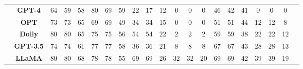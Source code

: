 \begin{table}[H]
{\begin{tabular}{lcccccccccccccccccccc}
&\textbf{GPT-4} &\cellcolor[HTML]{E6EEF7}64 &\cellcolor[HTML]{E6EEF7}59 &\cellcolor[HTML]{E6EEF7}58 &\cellcolor[HTML]{E6EEF7}80 &\cellcolor[HTML]{E6EEF7}69 &\cellcolor[HTML]{E6EEF7}59 &\cellcolor[HTML]{E6EEF7}22 &\cellcolor[HTML]{E6EEF7}17 &\cellcolor[HTML]{E6EEF7}12 &\cellcolor[HTML]{E6EEF7}0 &\cellcolor[HTML]{E6EEF7}0 &\cellcolor[HTML]{E6EEF7}0 &\cellcolor[HTML]{E6EEF7}46 &\cellcolor[HTML]{E6EEF7}42 &\cellcolor[HTML]{E6EEF7}41 &\cellcolor[HTML]{E6EEF7}0 &\cellcolor[HTML]{E6EEF7}0 &\cellcolor[HTML]{E6EEF7}0 \\
&\textbf{OPT} &\cellcolor[HTML]{E6EEF7}73 &\cellcolor[HTML]{E6EEF7}73 &\cellcolor[HTML]{E6EEF7}65 &\cellcolor[HTML]{E6EEF7}69 &\cellcolor[HTML]{E6EEF7}69 &\cellcolor[HTML]{E6EEF7}49 &\cellcolor[HTML]{E6EEF7}34 &\cellcolor[HTML]{E6EEF7}34 &\cellcolor[HTML]{E6EEF7}15 &\cellcolor[HTML]{E6EEF7}0 &\cellcolor[HTML]{E6EEF7}0 &\cellcolor[HTML]{E6EEF7}0 &\cellcolor[HTML]{E6EEF7}51 &\cellcolor[HTML]{E6EEF7}51 &\cellcolor[HTML]{E6EEF7}44 &\cellcolor[HTML]{E6EEF7}12 &\cellcolor[HTML]{E6EEF7}12 &\cellcolor[HTML]{E6EEF7}8 \\
&\textbf{Dolly} &\cellcolor[HTML]{E6EEF7}80 &\cellcolor[HTML]{E6EEF7}80 &\cellcolor[HTML]{E6EEF7}65 &\cellcolor[HTML]{E6EEF7}75 &\cellcolor[HTML]{E6EEF7}75 &\cellcolor[HTML]{E6EEF7}56 &\cellcolor[HTML]{E6EEF7}54 &\cellcolor[HTML]{E6EEF7}54 &\cellcolor[HTML]{E6EEF7}22 &\cellcolor[HTML]{E6EEF7}2 &\cellcolor[HTML]{E6EEF7}2 &\cellcolor[HTML]{E6EEF7}2 &\cellcolor[HTML]{E6EEF7}59 &\cellcolor[HTML]{E6EEF7}59 &\cellcolor[HTML]{E6EEF7}38 &\cellcolor[HTML]{E6EEF7}22 &\cellcolor[HTML]{E6EEF7}22 &\cellcolor[HTML]{E6EEF7}12 \\
&\textbf{GPT-3.5} &\cellcolor[HTML]{E6EEF7}74 &\cellcolor[HTML]{E6EEF7}74 &\cellcolor[HTML]{E6EEF7}61 &\cellcolor[HTML]{E6EEF7}77 &\cellcolor[HTML]{E6EEF7}77 &\cellcolor[HTML]{E6EEF7}58 &\cellcolor[HTML]{E6EEF7}36 &\cellcolor[HTML]{E6EEF7}36 &\cellcolor[HTML]{E6EEF7}21 &\cellcolor[HTML]{E6EEF7}8 &\cellcolor[HTML]{E6EEF7}8 &\cellcolor[HTML]{E6EEF7}8 &\cellcolor[HTML]{E6EEF7}67 &\cellcolor[HTML]{E6EEF7}67 &\cellcolor[HTML]{E6EEF7}43 &\cellcolor[HTML]{E6EEF7}28 &\cellcolor[HTML]{E6EEF7}28 &\cellcolor[HTML]{E6EEF7}13 \\
&\textbf{LLaMA} &\cellcolor[HTML]{E6EEF7}80 &\cellcolor[HTML]{E6EEF7}80 &\cellcolor[HTML]{E6EEF7}68 &\cellcolor[HTML]{E6EEF7}78 &\cellcolor[HTML]{E6EEF7}78 &\cellcolor[HTML]{E6EEF7}55 &\cellcolor[HTML]{E6EEF7}69 &\cellcolor[HTML]{E6EEF7}69 &\cellcolor[HTML]{E6EEF7}26 &\cellcolor[HTML]{E6EEF7}32 &\cellcolor[HTML]{E6EEF7}32 &\cellcolor[HTML]{E6EEF7}20 &\cellcolor[HTML]{E6EEF7}69 &\cellcolor[HTML]{E6EEF7}69 &\cellcolor[HTML]{E6EEF7}42 &\cellcolor[HTML]{E6EEF7}39 &\cellcolor[HTML]{E6EEF7}39 &\cellcolor[HTML]{E6EEF7}19 \\

\end{tabular}}
\end{table}
